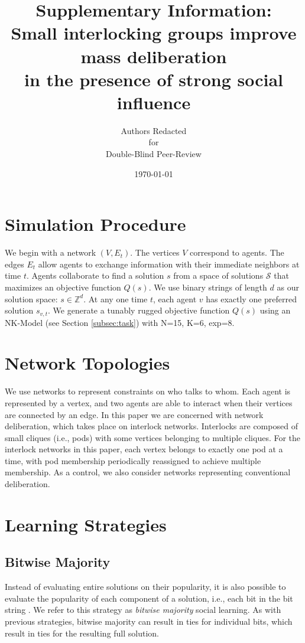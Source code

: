 \documentclass[twocolumn,10pt]{article}
\title{Supplementary Information: \\
Small interlocking groups improve mass deliberation\\in the presence of strong social influence}
\author{
Authors Redacted \\
for \\
Double-Blind Peer-Review
}
\date{\today}
\begin{document}
\maketitle

\section{Simulation Procedure}
We begin with a network $(V,E_t)$. The vertices $V$ correspond to agents. The edges $E_t$ allow agents to exchange information with their immediate neighbors at time $t$.
Agents collaborate to find a solution $s$ from a space of solutions $\mathcal{S}$ that maximizes an objective function $Q(s)$.
We use binary strings of length $d$ as our solution space: $s \in \mathbb{Z}^d$.
At any one time $t$, each agent $v$ has exactly one preferred solution $s_{v,t}$.
We generate a tunably rugged objective function $Q(s)$ using an NK-Model \cite{kauffman_towards_1987} (see Section \ref{subsec:task}) with N=15, K=6, exp=8.

\section{Network Topologies}

We use networks to represent constraints on who talks to whom. Each agent is represented by a vertex, and two agents are able to interact when their vertices are connected by an edge. In this paper we are concerned with network deliberation, which takes place on interlock networks. Interlocks are composed of small cliques (i.e., pods) with some vertices belonging to multiple cliques. For the interlock networks in this paper, each vertex belongs to exactly one pod at a time, with pod membership periodically reassigned to achieve multiple membership. As a control, we also consider networks representing conventional deliberation.


\section{Learning Strategies}
\label{sec:learning}

\iffalse

\subsection{Bitwise Majority}
Instead of evaluating entire solutions on their popularity, it is also possible to evaluate the popularity of each component of a solution, i.e., each bit in the bit string \cite{platt_network_2018}.
We refer to this strategy as {\em bitwise majority} social learning.
As with previous strategies, bitwise majority can result in ties for individual bits, which result in ties for the resulting full solution.
\end{document}
